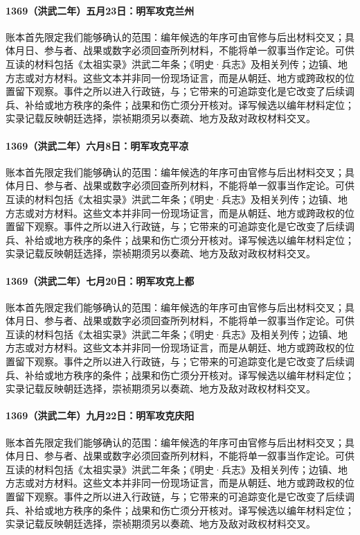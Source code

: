 \paragraph{1369（洪武二年）五月23日：明军攻克兰州} 账本首先限定我们能够确认的范围：编年候选的年序可由官修与后出材料交叉；具体月日、参与者、战果或数字必须回查所列材料，不能将单一叙事当作定论。可供互读的材料包括《太祖实录》洪武二年条；《明史·兵志》及相关列传；边镇、地方志或对方材料。这些文本并非同一份现场证言，而是从朝廷、地方或跨政权的位置留下观察。事件之所以进入行政链，与；它带来的可追踪变化是它改变了后续调兵、补给或地方秩序的条件；战果和伤亡须分开核对。译写候选以编年材料定位；实录记载反映朝廷选择，崇祯期须另以奏疏、地方及敌对政权材料交叉。

\paragraph{1369（洪武二年）六月8日：明军攻克平凉} 账本首先限定我们能够确认的范围：编年候选的年序可由官修与后出材料交叉；具体月日、参与者、战果或数字必须回查所列材料，不能将单一叙事当作定论。可供互读的材料包括《太祖实录》洪武二年条；《明史·兵志》及相关列传；边镇、地方志或对方材料。这些文本并非同一份现场证言，而是从朝廷、地方或跨政权的位置留下观察。事件之所以进入行政链，与；它带来的可追踪变化是它改变了后续调兵、补给或地方秩序的条件；战果和伤亡须分开核对。译写候选以编年材料定位；实录记载反映朝廷选择，崇祯期须另以奏疏、地方及敌对政权材料交叉。

\paragraph{1369（洪武二年）七月20日：明军攻克上都} 账本首先限定我们能够确认的范围：编年候选的年序可由官修与后出材料交叉；具体月日、参与者、战果或数字必须回查所列材料，不能将单一叙事当作定论。可供互读的材料包括《太祖实录》洪武二年条；《明史·兵志》及相关列传；边镇、地方志或对方材料。这些文本并非同一份现场证言，而是从朝廷、地方或跨政权的位置留下观察。事件之所以进入行政链，与；它带来的可追踪变化是它改变了后续调兵、补给或地方秩序的条件；战果和伤亡须分开核对。译写候选以编年材料定位；实录记载反映朝廷选择，崇祯期须另以奏疏、地方及敌对政权材料交叉。

\paragraph{1369（洪武二年）九月22日：明军攻克庆阳} 账本首先限定我们能够确认的范围：编年候选的年序可由官修与后出材料交叉；具体月日、参与者、战果或数字必须回查所列材料，不能将单一叙事当作定论。可供互读的材料包括《太祖实录》洪武二年条；《明史·兵志》及相关列传；边镇、地方志或对方材料。这些文本并非同一份现场证言，而是从朝廷、地方或跨政权的位置留下观察。事件之所以进入行政链，与；它带来的可追踪变化是它改变了后续调兵、补给或地方秩序的条件；战果和伤亡须分开核对。译写候选以编年材料定位；实录记载反映朝廷选择，崇祯期须另以奏疏、地方及敌对政权材料交叉。
